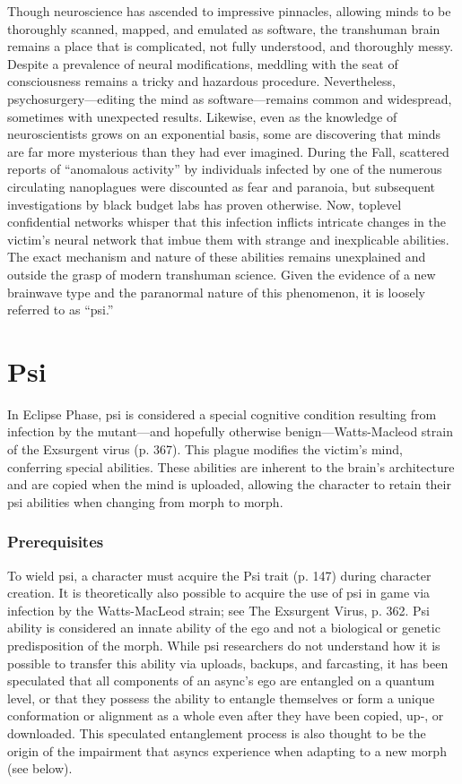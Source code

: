 \newpage



Though neuroscience has ascended to impressive pinnacles, allowing minds to be thoroughly scanned, mapped, and emulated as software, the transhuman brain remains a place that is complicated, not fully understood, and thoroughly messy. Despite a prevalence of neural modifications, meddling with the seat of consciousness remains a tricky and hazardous procedure. Nevertheless, psychosurgery—editing the mind as software—remains common and widespread, sometimes with unexpected results. Likewise, even as the knowledge of neuroscientists grows on an exponential basis, some are discovering that minds are far more mysterious than they had ever imagined. During the Fall, scattered reports of “anomalous activity” by individuals infected by one of the numerous circulating nanoplagues were discounted as fear and paranoia, but subsequent investigations by black budget labs has proven otherwise. Now, toplevel confidential networks whisper that this infection inflicts intricate changes in the victim’s neural network that imbue them with strange and inexplicable abilities. The exact mechanism and nature of these abilities remains unexplained and outside the grasp of modern transhuman science. Given the evidence of a new brainwave type and the paranormal nature of this phenomenon, it is loosely referred to as “psi.” 

\section{Psi} In Eclipse Phase, psi is considered a special cognitive condition resulting from infection by the mutant—and hopefully otherwise benign—Watts-Macleod strain of the Exsurgent virus (p. 367). This plague modifies the victim’s mind, conferring special abilities. These abilities are inherent to the brain’s architecture and are copied when the mind is uploaded, allowing the character to retain their psi abilities when changing from morph to morph. 

\subsubsection{Prerequisites} 

To wield psi, a character must acquire the Psi trait (p. 147) during character creation. It is theoretically also possible to acquire the use of psi in game via infection by the Watts-MacLeod strain; see The Exsurgent Virus, p. 362. Psi ability is considered an innate ability of the ego and not a biological or genetic predisposition of the morph. While psi researchers do not understand how it is possible to transfer this ability via uploads, backups, and farcasting, it has been speculated that all components of an async’s ego are entangled on a quantum level, or that they possess the ability to entangle themselves or form a unique conformation or alignment as a whole even after they have been copied, up-, or downloaded. This speculated entanglement process is also thought to be the origin of the impairment that asyncs experience when adapting to a new morph (see below). 

